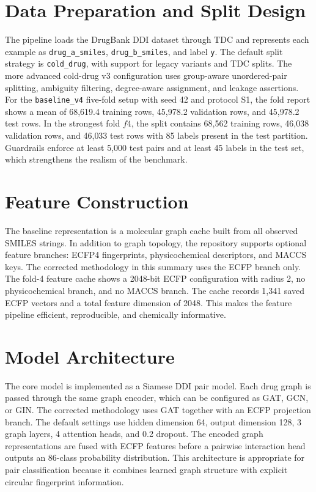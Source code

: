\documentclass[12pt,a4paper]{report}
\begin{document}
\section*{Data Preparation and Split Design}
The pipeline loads the DrugBank DDI dataset through TDC and represents each example as \texttt{drug\_a\_smiles}, \texttt{drug\_b\_smiles}, and label \texttt{y}. The default split strategy is \texttt{cold\_drug}, with support for legacy variants and TDC splits. The more advanced cold-drug v3 configuration uses group-aware unordered-pair splitting, ambiguity filtering, degree-aware assignment, and leakage assertions. For the \texttt{baseline\_v4} five-fold setup with seed 42 and protocol S1, the fold report shows a mean of 68{,}619.4 training rows, 45{,}978.2 validation rows, and 45{,}978.2 test rows. In the strongest fold \(f4\), the split contains 68{,}562 training rows, 46{,}038 validation rows, and 46{,}033 test rows with 85 labels present in the test partition. Guardrails enforce at least 5{,}000 test pairs and at least 45 labels in the test set, which strengthens the realism of the benchmark.

\section*{Feature Construction}
The baseline representation is a molecular graph cache built from all observed SMILES strings. In addition to graph topology, the repository supports optional feature branches: ECFP4 fingerprints, physicochemical descriptors, and MACCS keys. The corrected methodology in this summary uses the ECFP branch only. The fold-4 feature cache shows a 2048-bit ECFP configuration with radius 2, no physicochemical branch, and no MACCS branch. The cache records 1{,}341 saved ECFP vectors and a total feature dimension of 2048. This makes the feature pipeline efficient, reproducible, and chemically informative.

\section*{Model Architecture}
The core model is implemented as a Siamese DDI pair model. Each drug graph is passed through the same graph encoder, which can be configured as GAT, GCN, or GIN. The corrected methodology uses GAT together with an ECFP projection branch. The default settings use hidden dimension 64, output dimension 128, 3 graph layers, 4 attention heads, and 0.2 dropout. The encoded graph representations are fused with ECFP features before a pairwise interaction head outputs an 86-class probability distribution. This architecture is appropriate for pair classification because it combines learned graph structure with explicit circular fingerprint information.
\end{document}
